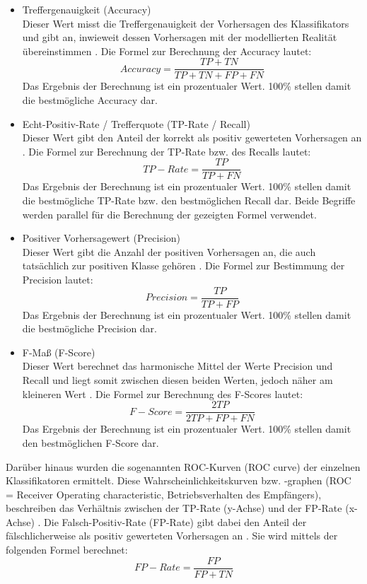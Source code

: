 \begin{itemize}
\item Treffergenauigkeit (Accuracy)
\\Dieser Wert misst die Treffergenauigkeit der Vorhersagen des Klassifikators und gibt an, inwieweit dessen Vorhersagen mit der modellierten Realität übereinstimmen \cite{Sammut2017}. Die Formel zur Berechnung der Accuracy lautet:
\\\[Accuracy = \frac{TP+TN}{TP+TN+FP+FN}\]
Das Ergebnis der Berechnung ist ein prozentualer Wert. 100\% stellen damit die bestmögliche Accuracy dar.
\item Echt-Positiv-Rate / Trefferquote (TP-Rate / Recall)
\\Dieser Wert gibt den Anteil der korrekt als positiv gewerteten Vorhersagen an \cite{Alpaydin2010}. Die Formel zur Berechnung der TP-Rate bzw. des Recalls lautet:
\\\[TP-Rate = \frac{TP}{TP+FN}\]
Das Ergebnis der Berechnung ist ein prozentualer Wert. 100\% stellen damit die bestmögliche TP-Rate bzw. den bestmöglichen Recall dar. Beide Begriffe werden parallel für die Berechnung der gezeigten Formel verwendet.
\item Positiver Vorhersagewert (Precision)
\\ Dieser Wert gibt die Anzahl der positiven Vorhersagen an, die auch tatsächlich zur positiven Klasse gehören \cite{Sammut2017}. Die Formel zur Bestimmung der Precision lautet:
\\\[Precision = \frac{TP}{TP+FP}\]
Das Ergebnis der Berechnung ist ein prozentualer Wert. 100\% stellen damit die bestmögliche Precision dar.
\item F-Maß (F-Score)
\\ Dieser Wert berechnet das harmonische Mittel der Werte Precision und Recall und liegt somit zwischen diesen beiden Werten, jedoch näher am kleineren Wert \cite{Sammut2017}. Die Formel zur Berechnung des F-Scores lautet:
\\\[F-Score = \frac{2TP}{2TP+FP+FN}\]
Das Ergebnis der Berechnung ist ein prozentualer Wert. 100\% stellen damit den bestmöglichen F-Score dar.
\end{itemize}

Darüber hinaus wurden die sogenannten ROC-Kurven (ROC curve) der einzelnen Klassifikatoren ermittelt. Diese Wahrscheinlichkeitskurven bzw. -graphen (ROC = Receiver Operating characteristic, Betriebsverhalten des Empfängers), beschreiben das Verhältnis zwischen der TP-Rate (y-Achse) und der FP-Rate (x-Achse) \cite{Sammut2017,Narkhede2018}. Die Falsch-Positiv-Rate (FP-Rate) gibt dabei den Anteil der fälschlicherweise als positiv gewerteten Vorhersagen an \cite{Alpaydin2010}. Sie wird mittels der folgenden Formel berechnet:
\\\[FP-Rate = \frac{FP}{FP+TN}\]

